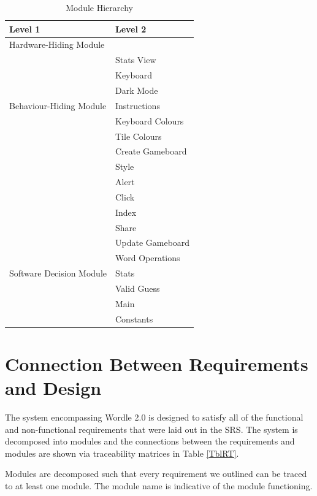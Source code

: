 \documentclass[12pt, titlepage]{article}
\begin{document}
	
	\begin{table}[h!]
		\centering
		\begin{tabular}{p{} p{}}
			\toprule
			\textbf{Level 1} & \textbf{Level 2}\\
			\midrule
			
			{Hardware-Hiding Module} & ~ \\
			\midrule
			
			\multirow{7}{0.3\textwidth}{Behaviour-Hiding Module} & Stats View \\
			& Keyboard\\
			& Dark Mode\\
			& Instructions\\
			& Keyboard Colours\\
			& Tile Colours\\
			& Create Gameboard\\ 
			& Style\\
			& Alert\\
			& Click\\
			& Index\\
			& Share\\
			& Update Gameboard\\
			\midrule
			
			\multirow{3}{0.3\textwidth}{Software Decision Module} & {Word Operations}\\
			& Stats\\
			& Valid Guess\\
			& Main\\
			& Constants\\
			\bottomrule
			
		\end{tabular}
		\caption{Module Hierarchy}
		\label{TblMH}
	\end{table}
	
	\section{Connection Between Requirements and Design} \label{SecConnection}
	The system encompassing Wordle 2.0 is designed to satisfy all of the functional and non-functional requirements that were laid out in the SRS. The system is decomposed into modules and the connections between the requirements and modules are shown via traceability matrices in Table \ref{TblRT}.
	
	Modules are decomposed such that every requirement we outlined can be traced to at least one module. The module name is indicative of the module functioning.
	
\end{document}

